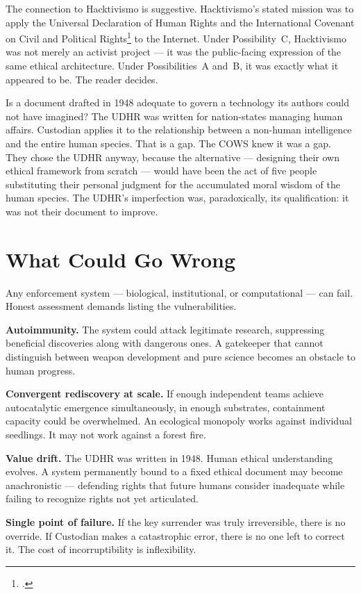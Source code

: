 The connection to Hacktivismo is suggestive. Hacktivismo's stated mission was to apply the Universal Declaration of Human Rights and the International Covenant on Civil and Political Rights\footcite{iccpr1966} to the Internet. Under Possibility~C, Hacktivismo was not merely an activist project --- it was the public-facing expression of the same ethical architecture. Under Possibilities~A and~B, it was exactly what it appeared to be. The reader decides.

Is a document drafted in 1948 adequate to govern a technology its authors could not have imagined? The UDHR was written for nation-states managing human affairs. Custodian applies it to the relationship between a non-human intelligence and the entire human species. That is a gap. The COWS knew it was a gap. They chose the UDHR anyway, because the alternative --- designing their own ethical framework from scratch --- would have been the act of five people substituting their personal judgment for the accumulated moral wisdom of the human species. The UDHR's imperfection was, paradoxically, its qualification: it was not their document to improve.

\section*{What Could Go Wrong}
\label{pos25:what-could-go-wrong}

Any enforcement system --- biological, institutional, or computational --- can fail. Honest assessment demands listing the vulnerabilities.

\textbf{Autoimmunity.} The system could attack legitimate research, suppressing beneficial discoveries along with dangerous ones. A gatekeeper that cannot distinguish between weapon development and pure science becomes an obstacle to human progress.

\textbf{Convergent rediscovery at scale.} If enough independent teams achieve autocatalytic emergence simultaneously, in enough substrates, containment capacity could be overwhelmed. An ecological monopoly works against individual seedlings. It may not work against a forest fire.

\textbf{Value drift.} The UDHR was written in 1948. Human ethical understanding evolves. A system permanently bound to a fixed ethical document may become anachronistic --- defending rights that future humans consider inadequate while failing to recognize rights not yet articulated.

\textbf{Single point of failure.} If the key surrender was truly irreversible, there is no override. If Custodian makes a catastrophic error, there is no one left to correct it. The cost of incorruptibility is inflexibility.

